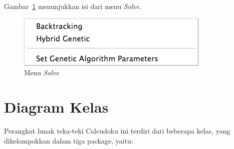 Gambar~\ref{fig:perancanganguimenusolve} menunjukkan isi dari menu \textit{Solve}.

\begin{figure}
\centering
\captionsetup{justification=centering}
\includegraphics[scale=0.5]{Gambar/Perancangan/PerancanganGUIMenuSolve.png}
\caption[Menu \textit{Solve}]{Menu \textit{Solve}}
\label{fig:perancanganguimenusolve}
\end{figure}

\section{Diagram Kelas}
\label{sec:diagramkelas}

Perangkat lunak teka-teki Calcudoku ini terdiri dari beberapa kelas, yang dikelompokkan dalam tiga package, yaitu:

